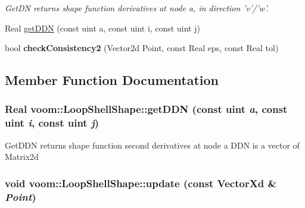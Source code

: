 \begin{DoxyCompactItemize}
\begin{DoxyCompactList}\small\item\em GetDN returns shape function derivatives at node a, in direction 'v'/'w'. \item\end{DoxyCompactList}\item 
Real \hyperlink{classvoom_1_1_loop_shell_shape_ae4b642b9ca45c273ee1e7e6bd45da5b1}{getDDN} (const uint a, const uint i, const uint j)
\item 
\hypertarget{classvoom_1_1_loop_shell_shape_ad372057dba715c332ca8272e1fca6bd1}{
bool {\bfseries checkConsistency2} (Vector2d Point, const Real eps, const Real tol)}
\label{classvoom_1_1_loop_shell_shape_ad372057dba715c332ca8272e1fca6bd1}

\end{DoxyCompactItemize}


\subsection{Member Function Documentation}
\hypertarget{classvoom_1_1_loop_shell_shape_ae4b642b9ca45c273ee1e7e6bd45da5b1}{
\subsubsection[{getDDN}]{\setlength{\rightskip}{0pt plus 5cm}Real voom::LoopShellShape::getDDN (const uint {\em a}, \/  const uint {\em i}, \/  const uint {\em j})}}
\label{classvoom_1_1_loop_shell_shape_ae4b642b9ca45c273ee1e7e6bd45da5b1}
GetDDN returns shape function second derivatives at node a DDN is a vector of Matrix2d \hypertarget{classvoom_1_1_loop_shell_shape_a0f3ec909fbedcb9f2c3bb073e054fdf0}{
\subsubsection[{update}]{\setlength{\rightskip}{0pt plus 5cm}void voom::LoopShellShape::update (const VectorXd \& {\em Point})}}
\label{classvoom_1_1_loop_shell_shape_a0f3ec909fbedcb9f2c3bb073e054fdf0}



